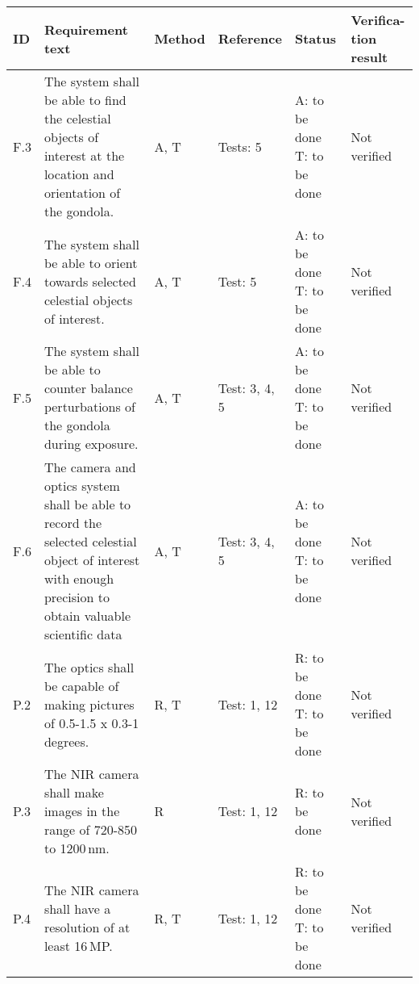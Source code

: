 
\makeatletter
\renewcommand\@makefntext[1]{\leftskip=3em\hskip-1em\@makefnmark#1}
\makeatother

\begin{longtable}[]{|m{}| m{}|m{}|m{}|m{}|m{}|}

\hline
\textbf{ID} & \textbf{Requirement text} & \textbf{Method} & \textbf{Reference} & \textbf{Status} & \textbf{Verifica-tion result} \\\hline

 F.3 & The system shall be able to find the celestial objects of interest at the location and orientation of the gondola.
& A, T & Tests: 5 & A: to be done \newline T: to be done & Not verified \\\hline

  F.4 & The system shall be able to orient towards selected celestial objects of interest.
& A, T & Test: 5 & A: to be done \newline T: to be done & Not verified \\\hline

  F.5 & The system shall be able to counter balance perturbations of the gondola during exposure.
& A, T & Test: 3, 4, 5 & A: to be done \newline T: to be done & Not verified \\\hline

  F.6 & The camera and optics system shall be able to record the selected celestial object of interest with enough precision to obtain valuable scientific data
& A, T & Test: 3, 4, 5 & A: to be done \newline T: to be done & Not verified \\\hline




P.2 & The optics shall be capable of making pictures of 0.5-1.5 x 0.3-1\,degrees.
& R, T & Test: 1, 12 & R: to be done \newline T: to be done  & Not verified \\\hline

P.3 & The NIR camera shall make images in the range of 720-850 to 1200\,nm.
& R & Test: 1, 12 & R: to be done  & Not verified \\\hline

P.4 & The NIR camera shall have a resolution of at least 16\,MP.
& R, T& Test: 1, 12 & R: to be done \newline T: to be done & Not verified \\\hline


\end{longtable}
